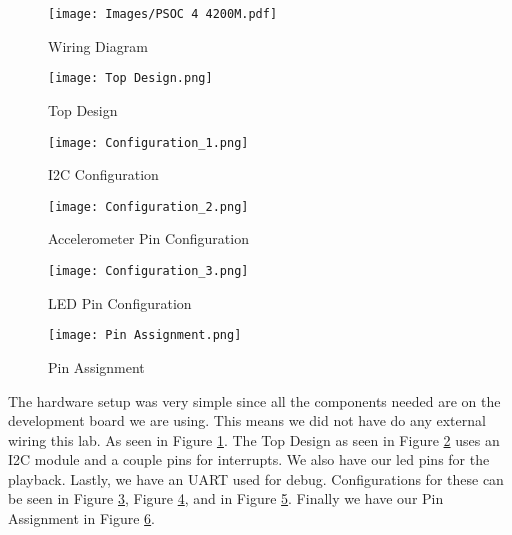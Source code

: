 \documentclass{article}
\begin{document}
    \begin{figure}[H]
      \centering
      \texttt{[image: Images/PSOC 4 4200M.pdf]}
      \caption{Wiring Diagram}
      \label{fig:Wiring Diagram} 
    \end{figure}

    \begin{figure}[H]
      \centering
      \texttt{[image: Top Design.png]}
      \caption{Top Design}
      \label{fig:Top Design} 
    \end{figure}

    \begin{figure}[H]
      \centering
      \texttt{[image: Configuration\_1.png]}
      \caption{I2C Configuration}
      \label{fig:I2C Configuration} 
    \end{figure}

    \begin{figure}[H]
      \centering
      \texttt{[image: Configuration\_2.png]}
      \caption{Accelerometer Pin Configuration}
      \label{fig:Accelerometer Pin Configuration} 
    \end{figure}

    \begin{figure}[H]
      \centering
      \texttt{[image: Configuration\_3.png]}
      \caption{LED Pin Configuration}
      \label{fig:LED Pin Configuration} 
    \end{figure}

    \begin{figure}[H]
      \centering
      \texttt{[image: Pin Assignment.png]}
      \caption{Pin Assignment}
      \label{fig:Pin Assignment} 
    \end{figure}

    The hardware setup was very simple since all the components needed are on the development board we are using. This means we did not have do any external wiring this lab. As seen in Figure \ref{fig:Wiring Diagram}. The Top Design as seen in Figure \ref{fig:Top Design} uses an I2C module and a couple pins for interrupts. We also have our led pins for the playback. Lastly, we have an UART used for debug. Configurations for these can be seen in Figure \ref{fig:I2C Configuration}, Figure \ref{fig:Accelerometer Pin Configuration}, and in Figure \ref {fig:LED Pin Configuration}. Finally we have our Pin Assignment in Figure \ref{fig:Pin Assignment}.
\end{document}
